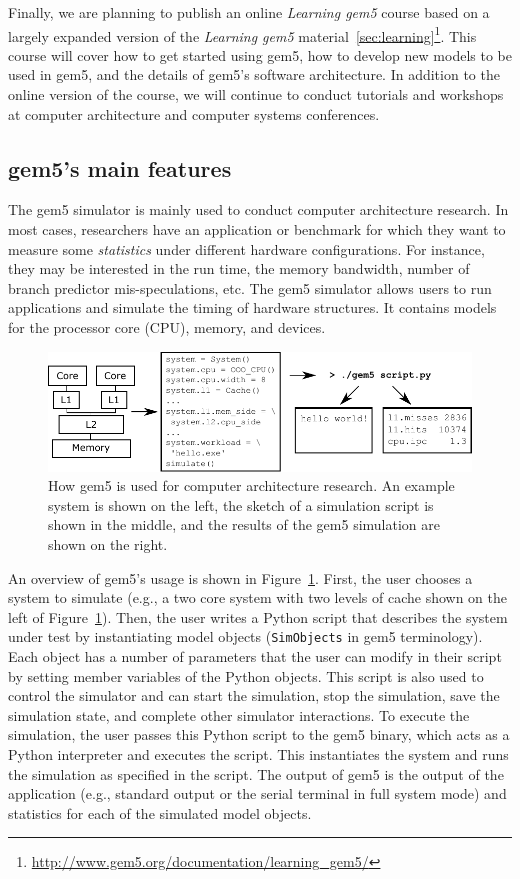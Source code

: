 Finally, we are planning to publish an online \emph{Learning gem5} course based on a largely expanded version of the \emph{Learning gem5} material~\ref{sec:learning}\footnote{\url{http://www.gem5.org/documentation/learning_gem5/}}.
This course will cover how to get started using gem5, how to develop new models to be used in gem5, and the details of gem5's software architecture.
In addition to the online version of the course, we will continue to conduct tutorials and workshops at computer architecture and computer systems conferences.

\subsection{gem5's main features}
\label{sec:main-features}

The gem5 simulator is mainly used to conduct computer architecture research.
In most cases, researchers have an application or benchmark for which they want to measure some \emph{statistics} under different hardware configurations.
For instance, they may be interested in the run time, the memory bandwidth, number of branch predictor mis-speculations, etc.
The gem5 simulator allows users to run applications and simulate the timing of hardware structures.
It contains models for the processor core (CPU), memory, and devices.

\begin{figure}
  \centering
  \includegraphics[width=0.7\linewidth]{fig/gem5-usage}
  \caption{How gem5 is used for computer architecture research. An example system is shown on the left, the sketch of a simulation script is shown in the middle, and the results of the gem5 simulation are shown on the right.}
  \label{fig:gem5-usage}
\end{figure}

An overview of gem5's usage is shown in Figure~\ref{fig:gem5-usage}.
First, the user chooses a system to simulate (e.g., a two core system with two levels of cache shown on the left of Figure~\ref{fig:gem5-usage}).
Then, the user writes a Python script that describes the system under test by instantiating model objects (\verb|SimObjects| in gem5 terminology).
Each object has a number of parameters that the user can modify in their script by setting member variables of the Python objects.
This script is also used to control the simulator and can start the simulation, stop the simulation, save the simulation state, and complete other simulator interactions.
To execute the simulation, the user passes this Python script to the gem5 binary, which acts as a Python interpreter and executes the script.
This instantiates the system and runs the simulation as specified in the script.
The output of gem5 is the output of the application (e.g., standard output or the serial terminal in full system mode) and statistics for each of the simulated model objects.

